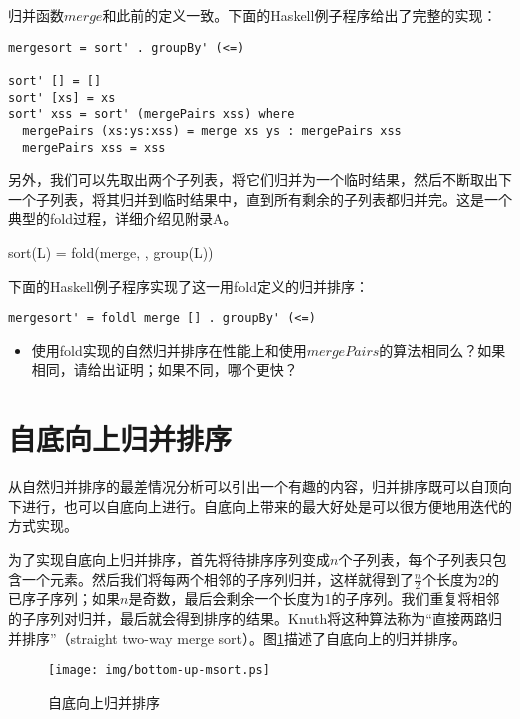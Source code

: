 \documentclass[UTF8]{article}
\begin{document}
归并函数$merge$和此前的定义一致。下面的Haskell例子程序给出了完整的实现：

\lstset{language=Haskell}
\begin{lstlisting}[style=Haskell]
mergesort = sort' . groupBy' (<=)

sort' [] = []
sort' [xs] = xs
sort' xss = sort' (mergePairs xss) where
  mergePairs (xs:ys:xss) = merge xs ys : mergePairs xss
  mergePairs xss = xss
\end{lstlisting}

另外，我们可以先取出两个子列表，将它们归并为一个临时结果，然后不断取出下一个子列表，将其归并到临时结果中，直到所有剩余的子列表都归并完。这是一个典型的fold过程，详细介绍见附录A。

\be
sort(L) = fold(merge, \phi, group(L))
\ee

下面的Haskell例子程序实现了这一用fold定义的归并排序：

\lstset{language=Haskell}
\begin{lstlisting}[style=Haskell]
mergesort' = foldl merge [] . groupBy' (<=)
\end{lstlisting}

\begin{Exercise}
\begin{itemize}
  \item 使用fold实现的自然归并排序在性能上和使用$mergePairs$的算法相同么？如果相同，请给出证明；如果不同，哪个更快？
\end{itemize}
\end{Exercise}

\section{自底向上归并排序}

从自然归并排序的最差情况分析可以引出一个有趣的内容，归并排序既可以自顶向下进行，也可以自底向上进行。自底向上带来的最大好处是可以很方便地用迭代的方式实现。

为了实现自底向上归并排序，首先将待排序序列变成$n$个子列表，每个子列表只包含一个元素。然后我们将每两个相邻的子序列归并，这样就得到了$\frac{n}{2}$个长度为2的已序子序列；如果$n$是奇数，最后会剩余一个长度为1的子序列。我们重复将相邻的子序列对归并，最后就会得到排序的结果。Knuth将这种算法称为“直接两路归并排序”（straight two-way merge sort）\cite{TAOCP}。图\ref{fig:bottom-up-msort}描述了自底向上的归并排序。

\begin{figure}[htbp]
 \centering
 \texttt{[image: img/bottom-up-msort.ps]}
 \caption{自底向上归并排序}
 \label{fig:bottom-up-msort}
\end{figure}
\end{document}
